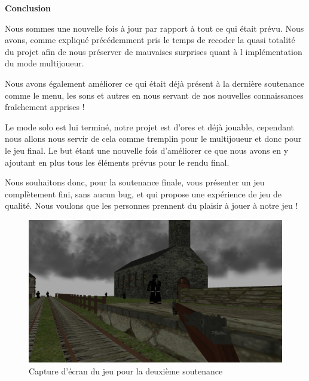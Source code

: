 \documentclass[11pt]{report}
\begin{document}
\newpage
\textbf{{\huge Conclusion}} \vspace{7mm}

Nous sommes une nouvelle fois à jour par rapport à tout ce qui était prévu. Nous avons, comme expliqué précédemment pris le temps de recoder la quasi totalité du projet afin de nous préserver de mauvaises surprises quant à l implémentation du mode multijoueur. 

Nous avons également améliorer ce qui était déjà présent à la dernière soutenance comme le menu, les sons et autres en nous servant de nos nouvelles connaissances fraîchement apprises !

Le mode solo est lui terminé, notre projet est d'ores et déjà jouable, cependant nous allons nous servir de cela comme tremplin pour le multijoueur et donc pour le jeu final. Le but étant une nouvelle fois d’améliorer ce que nous avons en y ajoutant en plus tous les éléments prévus pour le rendu final.

Nous souhaitons donc, pour la soutenance finale, vous présenter un jeu complètement fini, sans aucun bug,  et qui propose une expérience de jeu de qualité. Nous voulons que les personnes prennent du plaisir à jouer à notre jeu !\\

\begin{figure}[htbp]
\centering
\includegraphics[scale=0.20]{conclu-rendu.png}
\caption{ Capture d’écran du jeu pour la deuxième soutenance}
\end{figure}

\newpage
\listoffigures 
 
\end{document}
